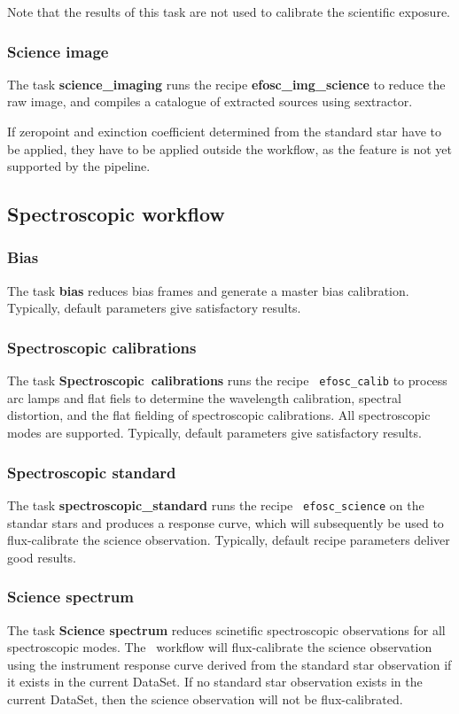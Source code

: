 Note that the results of this task are not used to calibrate the
scientific exposure.


\subsubsection{Science image}

The task {\bf science\_imaging} runs the recipe {\bf
  efosc\_img\_science} to reduce the raw image, and compiles a
catalogue of extracted sources using sextractor.

If zeropoint and exinction coefficient determined from the standard
star have to be applied, they have to be applied outside the workflow, as the feature is not yet supported by the pipeline.


\subsection{Spectroscopic workflow}


\subsubsection{Bias}

The task {\bf bias} reduces bias frames and generate a master bias
calibration. Typically, default parameters give satisfactory results.


\subsubsection{Spectroscopic calibrations}

The task {\bf Spectroscopic\ calibrations} runs the recipe {\tt
  efosc\_calib} to process arc lamps and flat fiels to determine the
wavelength calibration, spectral distortion, and the flat fielding of
spectroscopic calibrations. All spectroscopic modes are supported.
Typically, default parameters give satisfactory results.

\subsubsection{Spectroscopic standard}

The task {\bf spectroscopic\_standard} runs the recipe {\tt
  efosc\_science} on the standar stars and produces a response curve,
which will subsequently be used to flux-calibrate the science
observation. Typically, default recipe parameters deliver good
results.

\subsubsection{Science spectrum}

The task {\bf Science spectrum} reduces scinetific spectroscopic
observations for all spectroscopic modes. The \instname\ workflow will
flux-calibrate the science observation using the instrument response
curve derived from the standard star observation if it exists in the
current DataSet. If no standard star observation exists in the current
DataSet, then the science observation will not be flux-calibrated.
